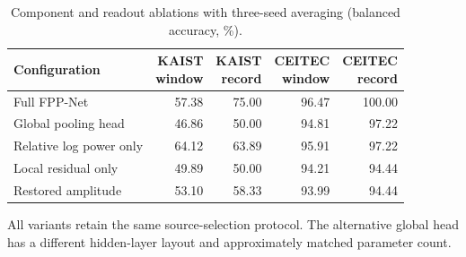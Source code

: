 \begin{table}[htbp]
\caption{Component and readout ablations with three-seed averaging (balanced accuracy, \%).}\label{tab:ablation}
\footnotesize
\setlength{\tabcolsep}{3pt}
\begin{tabularx}{\textwidth}{Xrrrr}
\toprule
Configuration & \shortstack{KAIST\\window} & \shortstack{KAIST\\record} & \shortstack{CEITEC\\window} & \shortstack{CEITEC\\record} \\
\midrule
Full FPP-Net & 57.38 & 75.00 & 96.47 & 100.00 \\
Global pooling head & 46.86 & 50.00 & 94.81 & 97.22 \\
Relative log power only & 64.12 & 63.89 & 95.91 & 97.22 \\
Local residual only & 49.89 & 50.00 & 94.21 & 94.44 \\
Restored amplitude & 53.10 & 58.33 & 93.99 & 94.44 \\
\bottomrule
\end{tabularx}
\vspace{2pt}\par\footnotesize All variants retain the same source-selection protocol. The alternative global head has a different hidden-layer layout and approximately matched parameter count.
\end{table}
